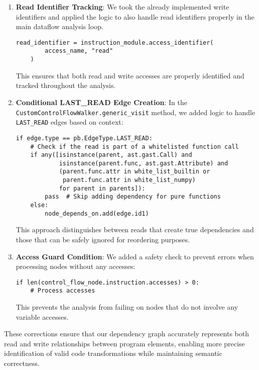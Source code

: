 \documentclass[%
thesis=student,%
coverpage=false,%
titlepage=false,%
headmarks=true, %
english,%
font=libertine, %
math=newpxtx, %
BCOR=5mm,%
coverBCOR=11mm%
]{tum-templates/book/tumbook}
\begin{document}
\begin{enumerate}
    \item \textbf{Read Identifier Tracking}: We took the already implemented write identifiers and applied the logic to also handle read identifiers properly in the main dataflow analysis loop.
    \begin{lstlisting}[style=pythonstyle, caption={Adjustment in get\_program\_graph}]
    read_identifier = instruction_module.access_identifier(
        access_name, "read"
    )
    \end{lstlisting}
    This ensures that both read and write accesses are properly identified and tracked throughout the analysis.
    \item \textbf{Conditional LAST\_READ Edge Creation}: In the \texttt{CustomControlFlowWalker.generic\_visit} method, we added logic to handle \texttt{LAST\_READ} edges based on context:
    \newpage
    \begin{lstlisting}[style=pythonstyle, caption={Adjustment in CustomControlFlowWalker.generic\_visit}]
    if edge.type == pb.EdgeType.LAST_READ:
    # Check if the read is part of a whitelisted function call
    if any([isinstance(parent, ast.gast.Call) and 
            isinstance(parent.func, ast.gast.Attribute) and 
            (parent.func.attr in white_list_builtin or 
             parent.func.attr in white_list_numpy) 
            for parent in parents]):
        pass  # Skip adding dependency for pure functions
    else:
        node_depends_on.add(edge.id1)
    \end{lstlisting}    
    This approach distinguishes between reads that create true dependencies and those that can be safely ignored for reordering purposes.

    \item \textbf{Access Guard Condition}: We added a safety check to prevent errors when processing nodes without any accesses:

    \begin{lstlisting}[style=pythonstyle, caption={Another adjustment in get\_program\_graph}]
    if len(control_flow_node.instruction.accesses) > 0:
    # Process accesses
    \end{lstlisting}    
    This prevents the analysis from failing on nodes that do not involve any variable accesses.
\end{enumerate}

These corrections ensure that our dependency graph accurately represents both read and write relationships between program elements, enabling more precise identification of valid code transformations while maintaining semantic correctness. 
\end{document}
